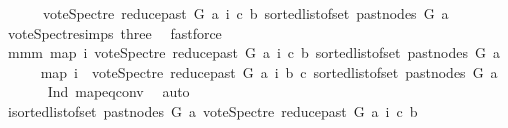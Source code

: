 \begin{isabellebody}
\ \ \ \ \ \ {\isacharparenleft}{\kern0pt}vote{\isacharunderscore}{\kern0pt}Spectre\ {\isacharparenleft}{\kern0pt}reduce{\isacharunderscore}{\kern0pt}past\ G\ a{\isacharparenright}{\kern0pt}\ i\ c\ b{\isacharparenright}{\kern0pt}{\isacharparenright}{\kern0pt}\ {\isacharparenleft}{\kern0pt}sorted{\isacharunderscore}{\kern0pt}list{\isacharunderscore}{\kern0pt}of{\isacharunderscore}{\kern0pt}set\ {\isacharparenleft}{\kern0pt}past{\isacharunderscore}{\kern0pt}nodes\ G\ a{\isacharparenright}{\kern0pt}{\isacharparenright}{\kern0pt}{\isacharparenright}{\kern0pt}{\isacharparenright}{\kern0pt}{\isacharparenright}{\kern0pt}{\isachardoublequoteclose}\isanewline
\ \ \ \ \ \ \isamarkupfalse%
\ vote{\isacharunderscore}{\kern0pt}Spectre{\isachardot}{\kern0pt}simps\ three\ \isamarkupfalse%
\ fastforce\ \isanewline
\ \ \ \ \isamarkupfalse%
\ mmm{\isacharcolon}{\kern0pt}\ {\isachardoublequoteopen}{\isacharparenleft}{\kern0pt}map\ {\isacharparenleft}{\kern0pt}{\isasymlambda}i{\isachardot}{\kern0pt}\ vote{\isacharunderscore}{\kern0pt}Spectre\ {\isacharparenleft}{\kern0pt}reduce{\isacharunderscore}{\kern0pt}past\ G\ a{\isacharparenright}{\kern0pt}\ i\ c\ b{\isacharparenright}{\kern0pt}\ {\isacharparenleft}{\kern0pt}sorted{\isacharunderscore}{\kern0pt}list{\isacharunderscore}{\kern0pt}of{\isacharunderscore}{\kern0pt}set\ {\isacharparenleft}{\kern0pt}past{\isacharunderscore}{\kern0pt}nodes\ G\ a{\isacharparenright}{\kern0pt}{\isacharparenright}{\kern0pt}{\isacharparenright}{\kern0pt}\ {\isacharequal}{\kern0pt}\isanewline
\ \ \ \ {\isacharparenleft}{\kern0pt}map\ {\isacharparenleft}{\kern0pt}{\isasymlambda}i{\isachardot}{\kern0pt}\ {\isacharminus}{\kern0pt}\ vote{\isacharunderscore}{\kern0pt}Spectre\ {\isacharparenleft}{\kern0pt}reduce{\isacharunderscore}{\kern0pt}past\ G\ a{\isacharparenright}{\kern0pt}\ i\ b\ c{\isacharparenright}{\kern0pt}\ {\isacharparenleft}{\kern0pt}sorted{\isacharunderscore}{\kern0pt}list{\isacharunderscore}{\kern0pt}of{\isacharunderscore}{\kern0pt}set\ {\isacharparenleft}{\kern0pt}past{\isacharunderscore}{\kern0pt}nodes\ G\ a{\isacharparenright}{\kern0pt}{\isacharparenright}{\kern0pt}{\isacharparenright}{\kern0pt}{\isachardoublequoteclose}\isanewline
\ \ \ \ \ \isamarkupfalse%
\ Ind\ map{\isacharunderscore}{\kern0pt}eq{\isacharunderscore}{\kern0pt}conv\ \isamarkupfalse%
\ auto\isanewline
\ \ \ \ \isamarkupfalse%
\ {\isachardoublequoteopen}{\isacharparenleft}{\kern0pt}{\isasymSum}i{\isasymleftarrow}sorted{\isacharunderscore}{\kern0pt}list{\isacharunderscore}{\kern0pt}of{\isacharunderscore}{\kern0pt}set\ {\isacharparenleft}{\kern0pt}past{\isacharunderscore}{\kern0pt}nodes\ G\ a{\isacharparenright}{\kern0pt}{\isachardot}{\kern0pt}\ vote{\isacharunderscore}{\kern0pt}Spectre\ {\isacharparenleft}{\kern0pt}reduce{\isacharunderscore}{\kern0pt}past\ G\ a{\isacharparenright}{\kern0pt}\ i\ c\ b{\isacharparenright}{\kern0pt}\ {\isacharequal}{\kern0pt}\isanewline

\end{isabellebody}
